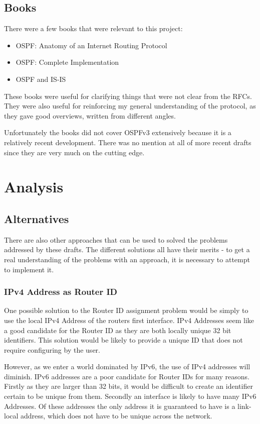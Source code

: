 \documentclass[12pt]{report}
\begin{document}
\section{Books}
There were a few books that were relevant to this project:
\begin{itemize}
  \item OSPF: Anatomy of an Internet Routing Protocol \cite{OSPFAIRP}
  \item OSPF: Complete Implementation \cite{OSPFCI}
  \item OSPF and IS-IS \cite{OSPFvsISIS}
\end{itemize}

These books were useful for clarifying things that were not clear from the
RFCs. They were also useful for reinforcing my general understanding of the
protocol, as they gave good overviews, written from different angles. 

Unfortunately the books did not cover OSPFv3 extensively because it is a
relatively recent development. There was no mention at all of more recent
drafts since they are very much on the cutting edge.

\chapter{Analysis}

\section{Alternatives}
There are also other approaches that can be used to solved the problems
addressed by these drafts. The different solutions all have their merits - to
get a real understanding of the problems with an approach, it is necessary to
attempt to implement it.

\subsection{IPv4 Address as Router ID}
One possible solution to the Router ID assignment problem would be simply to use
the local IPv4 Address of the routers first interface. IPv4 Addresses seem like
a good candidate for the Router ID as they are both locally unique 32 bit
identifiers. This solution would be likely to provide a unique ID that does not
require configuring by the user.
 
However, as we enter a world dominated by IPv6, the use of IPv4 addresses will
diminish. IPv6 addresses are a poor candidate for Router IDs for many reasons.
Firstly as they are larger than 32 bits, it would be difficult to create an identifier
certain to be unique from them. Secondly an interface is likely to have
many IPv6 Addresses. Of these addresses the only address it is guaranteed to
have is a link-local address, which does not have to be unique across the
network. 
\end{document}
